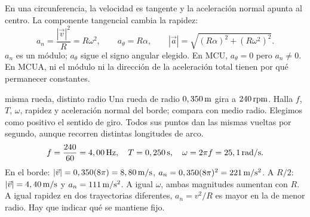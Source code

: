\documentclass[11pt,a4paper]{article}
\begin{document}
En una circunferencia, la velocidad es tangente y la aceleraci\'on normal apunta
al centro. La componente tangencial cambia la rapidez:
\[
a_n=\frac{|\vec v|^2}{R}=R\omega^2,\qquad
a_\theta=R\alpha,\qquad
|\vec a|=\sqrt{(R\alpha)^2+(R\omega^2)^2}.
\]
$a_n$ es un m\'odulo; $a_\theta$ sigue el signo angular elegido.
En MCU, $a_\theta=0$ pero $a_n\ne0$. En MCUA, ni el m\'odulo ni la direcci\'on de
la aceleraci\'on total tienen por qu\'e permanecer constantes.
\begin{center}
\end{center}

\begin{examplebox}{misma rueda, distinto radio}
 Una rueda de radio $0,350\,\mathrm{m}$ gira a $240\,\mathrm{rpm}$.
Halla $f$, $T$, $\omega$, rapidez y aceleraci\'on normal del borde; compara con medio radio.
\solutionblock
{} Elegimos como positivo el sentido de giro. Todos sus puntos dan las
mismas vueltas por segundo, aunque recorren distintas longitudes de arco.
\[
f=\frac{240}{60}=4,00\,\mathrm{Hz},\quad T=0,250\,\mathrm{s},\quad
\omega=2\pi f=25,1\,\mathrm{rad/s}.
\]
En el borde: $|\vec v|=0,350(8\pi)=8,80\,\mathrm{m/s}$,
$a_n=0,350(8\pi)^2=221\,\mathrm{m/s^2}$.
A $R/2$: $|\vec v|=4,40\,\mathrm{m/s}$ y $a_n=111\,\mathrm{m/s^2}$.
 A igual $\omega$, ambas magnitudes aumentan con $R$.
A igual rapidez en dos trayectorias diferentes, $a_n=v^2/R$ es mayor en la de menor radio.
Hay que indicar qu\'e se mantiene fijo.
\end{examplebox}
\end{document}
